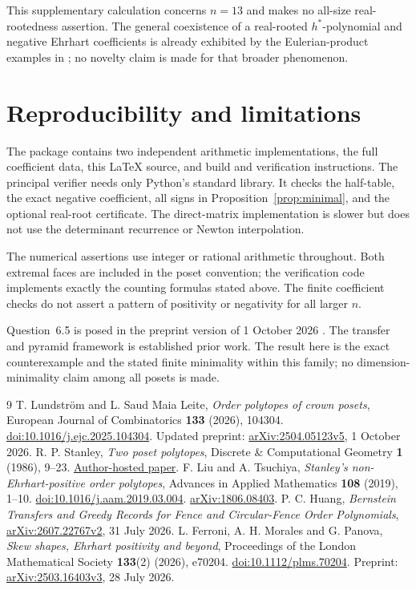\documentclass[11pt,letterpaper]{article}
\begin{document}
This supplementary calculation concerns $n=13$ and makes no all-size real-rootedness assertion. The general coexistence of a real-rooted $h^*$-polynomial and negative Ehrhart coefficients is already exhibited by the Eulerian-product examples in \cite[Example~3.2]{LT}; no novelty claim is made for that broader phenomenon.

\section{Reproducibility and limitations}
The package contains two independent arithmetic implementations, the full coefficient data, this LaTeX source, and build and verification instructions. The principal verifier needs only Python's standard library. It checks the half-table, the exact negative coefficient, all signs in Proposition~\ref{prop:minimal}, and the optional real-root certificate. The direct-matrix implementation is slower but does not use the determinant recurrence or Newton interpolation.

The numerical assertions use integer or rational arithmetic throughout. Both extremal faces are included in the poset convention; the verification code implements exactly the counting formulas stated above. The finite coefficient checks do not assert a pattern of positivity or negativity for all larger $n$.

Question~6.5 is posed in the preprint version of 1 October 2026 \cite{LSML}. The transfer and pyramid framework is established prior work. The result here is the exact counterexample and the stated finite minimality within this family; no dimension-minimality claim among all posets is made.


\begin{thebibliography}{9}
T. Lundstr\"om and L. Saud Maia Leite,
\emph{Order polytopes of crown posets},
European Journal of Combinatorics \textbf{133} (2026), 104304.
\href{https://doi.org/10.1016/j.ejc.2025.104304}{doi:10.1016/j.ejc.2025.104304}.
Updated preprint: \href{https://arxiv.org/abs/2504.05123v5}{arXiv:2504.05123v5}, 1 October 2026.
R. P. Stanley, \emph{Two poset polytopes}, Discrete \& Computational Geometry \textbf{1} (1986), 9--23.
\href{https://math.mit.edu/~rstan/pubs/pubfiles/66.pdf}{Author-hosted paper}.
F. Liu and A. Tsuchiya, \emph{Stanley's non-Ehrhart-positive order polytopes}, Advances in Applied Mathematics \textbf{108} (2019), 1--10.
\href{https://doi.org/10.1016/j.aam.2019.03.004}{doi:10.1016/j.aam.2019.03.004}.
\href{https://arxiv.org/abs/1806.08403}{arXiv:1806.08403}.
P. C. Huang, \emph{Bernstein Transfers and Greedy Records for Fence and Circular-Fence Order Polynomials}, \href{https://arxiv.org/abs/2607.22767v2}{arXiv:2607.22767v2}, 31 July 2026.
L. Ferroni, A. H. Morales and G. Panova, \emph{Skew shapes, Ehrhart positivity and beyond}, Proceedings of the London Mathematical Society \textbf{133}(2) (2026), e70204.
\href{https://doi.org/10.1112/plms.70204}{doi:10.1112/plms.70204}.
Preprint: \href{https://arxiv.org/abs/2503.16403v3}{arXiv:2503.16403v3}, 28 July 2026.
\end{thebibliography}
\end{document}
